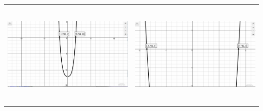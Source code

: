 \documentclass{ximera}
\begin{document}
\begin{example}
\begin{enumerate}
\begin{center}
\begin{tabular}{cc}
\includegraphics[width = 3in, height=2in]{./RealZerosGraphics/RealZerosEx02a.jpg}  &\includegraphics[width = 3in, height=2in]{./RealZerosGraphics/RealZerosEx02b.jpg}

\end{tabular}
\end{center} 


\end{enumerate}
\end{example}
\end{document}
